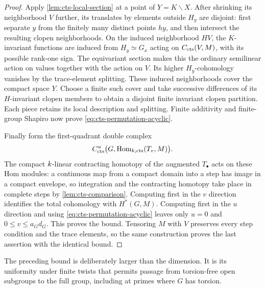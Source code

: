 \begin{proof}
Apply \cref{lem:cts-local-section} at a point of $Y=K\backslash X$.
After shrinking its neighborhood $V$ further, its translates by
elements outside $H_y$ are disjoint: first separate $y$ from the
finitely many distinct points $hy$, and then intersect the resulting
clopen neighborhoods.  On the induced neighborhood $HV$, the
$K$-invariant functions are induced from $H_y\simeq G_x$ acting on
$C_{\mathrm{cts}}(V,M)$, with its possible rank-one sign.  The equivariant
section makes this the ordinary semilinear action on values together
with the action on $V$.  Its higher $H_y$-cohomology vanishes by the
trace-element splitting.  These induced neighborhoods cover the
compact space $Y$.  Choose a finite such cover and take successive
differences of its $H$-invariant clopen members to obtain a disjoint
finite invariant clopen partition.  Each piece retains its local
description and splitting.  Finite additivity and finite-group
Shapiro now prove \eqref{eq:cts-permutation-acyclic}.

Finally form the first-quadrant double complex
\[
 C^u_{\mathrm{cts}}\bigl(G,\operatorname{Hom}_{k,\mathrm{cts}}(T_v,M)\bigr).
\]
The compact $k$-linear contracting homotopy of the augmented
$T_\bullet$ acts on these Hom modules: a continuous map from a
compact domain into a step has image in a compact envelope, so
integration and the contracting homotopy take place in complete
steps by \cref{lem:cts-comparison}.  Computing first in the $v$
direction identifies the total cohomology with $H^*(G,M)$.
Computing first in the $u$ direction and using
\eqref{eq:cts-permutation-acyclic} leaves only $u=0$ and
$0\leq v\leq a_Gd_G$.  This proves the bound.  Tensoring $M$ with
$V$ preserves every step condition and the trace elements, so the
same construction proves the last assertion with the identical
bound.
\end{proof}

The preceding bound is deliberately larger than the dimension.
It is its uniformity under finite twists that permits passage from
torsion-free open subgroups to the full group, including at primes
where $G$ has torsion.


